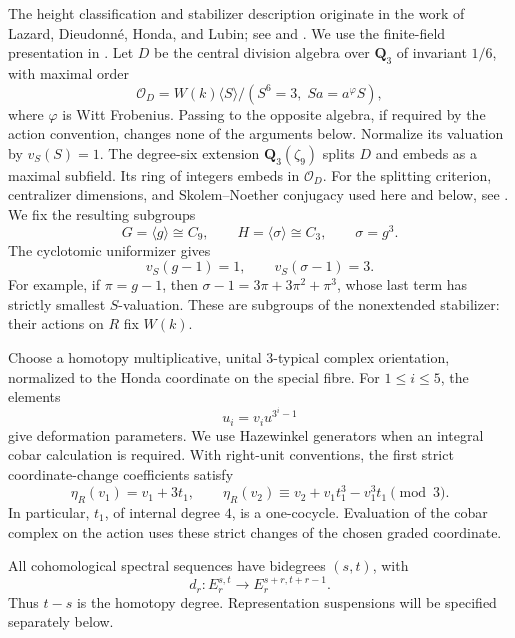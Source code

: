 \documentclass[11pt]{article}
\theoremstyle{definition}
\theoremstyle{remark}
\numberwithin{equation}{section}
\begin{document}
The height classification and stabilizer description originate in
the work of Lazard, Dieudonn\'e, Honda, and Lubin;
see \cite[Theorem~IV]{Lazard} and \cite[Theorem~1]{Honda}.
We use the finite-field presentation in
\cite[Appendix~A2.2.12 and A2.2.17--18]{Ravenel}.
Let \(D\) be the central division algebra over \(\mathbf Q_3\) of invariant
\(1/6\), with maximal order
\[
 \mathcal O_D=
 W(k)\langle S\rangle/(S^6=3,\;Sa=a^\varphi S),
\]
where \(\varphi\) is Witt Frobenius.  Passing to the opposite algebra,
if required by the action convention, changes none of the arguments
below.  Normalize its valuation by \(v_S(S)=1\).
The degree-six extension \(\mathbf Q_3(\zeta_9)\) splits \(D\) and embeds as a
maximal subfield.  Its ring of integers embeds in \(\mathcal O_D\).
For the splitting criterion, centralizer dimensions, and
Skolem--Noether conjugacy used here and below, see
\cite[Chapter~IV, Theorems~2.10 and~3.1, Corollary~3.7, and Remark~4.4(c)]{MilneCFT}.
We fix the resulting subgroups
\begin{equation}\label{det:groups}
 G=\langle g\rangle\cong C_9,\qquad
 H=\langle \sigma\rangle\cong C_3,\qquad
 \sigma=g^3 .
\end{equation}
The cyclotomic uniformizer gives
\begin{equation}\label{det:valuations}
 v_S(g-1)=1,\qquad v_S(\sigma-1)=3.
\end{equation}
For example, if \(\pi=g-1\), then
\(\sigma-1=3\pi+3\pi^2+\pi^3\), whose last term has strictly
smallest \(S\)-valuation.  These are subgroups of the nonextended
stabilizer: their actions on \(R\) fix \(W(k)\).

Choose a homotopy multiplicative, unital \(3\)-typical complex
orientation, normalized to the Honda coordinate on the special
fibre.  For \(1\leq i\leq5\), the elements
\[
 u_i=v_i u^{3^i-1}
\]
give deformation parameters.  We use Hazewinkel generators when an
integral cobar calculation is required.  With right-unit conventions,
the first strict coordinate-change coefficients satisfy
\begin{equation}\label{det:right-units}
 \eta_R(v_1)=v_1+3t_1,\qquad
 \eta_R(v_2)\equiv
 v_2+v_1t_1^3-v_1^3t_1\pmod3 .
\end{equation}
In particular, \(t_1\), of internal degree \(4\), is a
one-cocycle.  Evaluation of the cobar complex on the action uses these
strict changes of the chosen graded coordinate.

All cohomological spectral sequences have bidegrees \((s,t)\), with
\[
 d_r:E_r^{s,t}\longrightarrow E_r^{s+r,t+r-1}.
\]
Thus \(t-s\) is the homotopy degree.  Representation suspensions will
be specified separately below.
\end{document}
